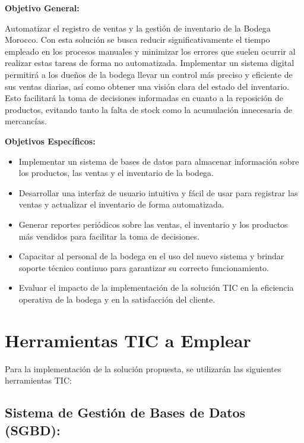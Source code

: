 \documentclass{article}
\begin{document}
  \begin{spacing}{1.5}
    \noindent
    \textbf{Objetivo General:} 
    
    Automatizar el registro de ventas y la gestión de inventario de la Bodega Morocco. Con esta solución se busca reducir significativamente el tiempo empleado en los procesos manuales y minimizar los errores que suelen ocurrir al realizar estas tareas de forma no automatizada. Implementar un sistema digital permitirá a los dueños de la bodega llevar un control más preciso y eficiente de sus ventas diarias, así como obtener una visión clara del estado del inventario. Esto facilitará la toma de decisiones informadas en cuanto a la reposición de productos, evitando tanto la falta de stock como la acumulación innecesaria de mercancías.

    \textbf{Objetivos Específicos:}
    \begin{itemize}
      \item Implementar un sistema de bases de datos para almacenar información sobre los productos, las ventas y el inventario de la bodega.
      \item Desarrollar una interfaz de usuario intuitiva y fácil de usar para registrar las ventas y actualizar el inventario de forma automatizada.
      \item Generar reportes periódicos sobre las ventas, el inventario y los productos más vendidos para facilitar la toma de decisiones.
      \item Capacitar al personal de la bodega en el uso del nuevo sistema y brindar soporte técnico continuo para garantizar su correcto funcionamiento.
      \item Evaluar el impacto de la implementación de la solución TIC en la eficiencia operativa de la bodega y en la satisfacción del cliente.
    \end{itemize}
  \end{spacing}

\newpage

\section{Herramientas TIC a Emplear}

  Para la implementación de la solución propuesta, se utilizarán las siguientes herramientas TIC:

  \subsection{Sistema de Gestión de Bases de Datos (SGBD):}
\end{document}
